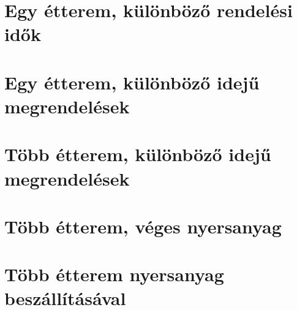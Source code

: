 \documentclass[a4paper]{paper}
\begin{document}
\section{Egy étterem, különböző rendelési idők}

\section{Egy étterem, különböző idejű megrendelések}

\section{Több étterem, különböző idejű megrendelések}

\section{Több étterem, véges nyersanyag}

\section{Több étterem nyersanyag beszállításával}
\end{document}
